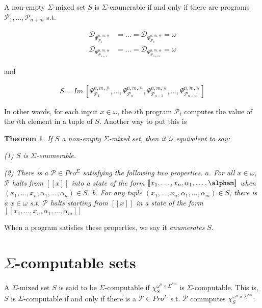 \documentclass[a4paper, 12pt]{article}
\newtheorem{theorem}{Theorem}
\newtheorem{theorem}{Theorem}
\begin{document}
A non-empty $\Sigma$-mixed set $S$ is $\Sigma$-enumerable if and only if there are
programs $\mathcal{P}_1, \ldots, \mathcal{P}_{n + m}$ s.t. 

\begin{align*}
    \mathcal{D}_{\Psi_{\mathcal{P}_1}^{n, m, \#}} &= \ldots =
    \mathcal{D}_{\Psi_{\mathcal{P}_n}^{n, m, \#}} = \omega\\
    \mathcal{D}_{\Psi_{\mathcal{P}_{n+1}}^{n, m, \#}} &= \ldots =
    \mathcal{D}_{\Psi_{\mathcal{P}_{n+m}}^{n, m, \#}} = \omega
\end{align*}

and 

\begin{align*}
    S = Im ~ \left[ \Psi_{\mathcal{P}_1}^{n, m, \#}, \ldots,
    \Psi_{\mathcal{P}_n}^{n, m, \#}, \Psi_{\mathcal{P}_{n+1}}^{n, m, \#},
\ldots, \Psi_{\mathcal{P}_{n+m}}^{n, m, \#} \right] 
\end{align*}

In other words, for each input $x \in \omega$, the $i$th program $\mathcal{P}_i$
computes the value of the $i$th element in a tuple of $S$. Another way to put
this is 


\begin{theorem}
    If $S$ a non-empty $\Sigma$-mixed set, then it is equivalent to say: 

    \textit{(1)} $S$ is $\Sigma$-enumerable. 

    \textit{(2)} There is a $\mathcal{P} \in Pro^{\Sigma}$ satisfying the
    following two properties. $a.$ For all $x \in \omega$, $\mathcal{P}$ halts
    from $[\![ x ]\!]$ into a state of the form $[\![ x_1, \ldots, x_n,
    \alpha_1, \ldots, \alpham ]\!]$ when $(x_1, \ldots, x_n, \alpha_1, \ldots,
    \alpha_n) \in S$. \textit{b.} For any tuple $(x_1, \ldots, x_n, \alpha_1, \ldots, \alpha_m) \in
S$, there is a $x \in \omega$ s.t. $\mathcal{P}$ halts starting from $[\![ x
]\!]$ in a state of the form $[\![ x_1, \ldots, x_n, \alpha_1, \ldots, \alpha_m ]\!]$ 

\end{theorem}

When a program satisfies these properties, we say it \textit{enumerates} $S$.

\section{$\Sigma$-computable sets}

A $\Sigma$-mixed set $S$ is said to be $\Sigma$-computable if
$\chi_{S}^{\omega^n \times \Sigma^{*m}}$ is $\Sigma$-computable. This is, $S$ is
$\Sigma$-computable if and only if there is a $\mathcal{P} \in Pro^{\Sigma}$
s.t. $\mathcal{P}$ commputes $\chi_S^{\omega^n \times \Sigma^{*m}}$. 
\end{document}
